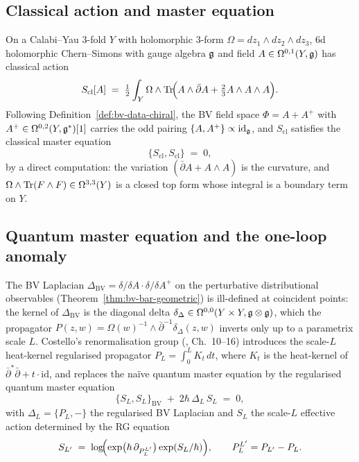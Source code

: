 \subsection{Classical action and master equation}
\label{subsec:hcs-cma}

On a Calabi--Yau $3$-fold $Y$ with holomorphic $3$-form
$\Omega = dz_1\wedge dz_2\wedge dz_3$, 6d holomorphic Chern--Simons
with gauge algebra $\mathfrak{g}$ and field
$A\in\Omega^{0,1}(Y,\mathfrak{g})$ has classical action
\begin{equation}\label{eq:hcs-classical-action}
 S_{\mathrm{cl}}[A] \;=\; \tfrac{1}{2}\int_Y \Omega\wedge
 \operatorname{Tr}\!\Bigl(A\wedge\bar\partial A + \tfrac{2}{3}A\wedge A\wedge A\Bigr).
\end{equation}
Following Definition~\ref{def:bv-data-chiral}, the BV field space
$\Phi = A + A^+$ with $A^+\in\Omega^{0,2}(Y,\mathfrak{g}^*)[1]$ carries the odd
pairing $\{A, A^+\}\propto \mathrm{id}_{\mathfrak{g}}$, and
$S_{\mathrm{cl}}$ satisfies the classical master equation
\begin{equation}\label{eq:cme}
 \{S_{\mathrm{cl}}, S_{\mathrm{cl}}\} \;=\; 0,
\end{equation}
by a direct computation: the variation $(\bar\partial A + A\wedge A)$
is the curvature, and $\Omega\wedge\operatorname{Tr}(F\wedge F)\in\Omega^{3,3}(Y)$ is
a closed top form whose integral is a boundary term on $Y$.

\subsection{Quantum master equation and the one-loop anomaly}
\label{subsec:hcs-qme}

The BV Laplacian
$\Delta_{\mathrm{BV}} = \delta/\delta A\cdot\delta/\delta A^+$ on the
perturbative distributional observables (Theorem~\ref{thm:bv-bar-geometric})
is ill-defined at coincident points: the kernel of
$\Delta_{\mathrm{BV}}$ is the diagonal delta
$\delta_{\Delta}\in\Omega^{0,0}(Y\times Y,\mathfrak{g}\otimes\mathfrak{g})$, which the
propagator
$P(z,w) = \Omega(w)^{-1}\wedge\bar\partial^{-1}\delta_{\Delta}(z,w)$
inverts only up to a parametrix scale $L$.
Costello's renormalisation group
(\cite{costello-renormalization}, Ch.~10--16) introduces the
scale-$L$ heat-kernel regularised propagator
$P_{L} = \int_0^{L} K_t\,dt$, where $K_t$ is the heat-kernel
of $\bar\partial^*\bar\partial + t\cdot\mathrm{id}$, and replaces the
na\"ive quantum master equation by the regularised quantum master equation
\begin{equation}\label{eq:qme}
 \{S_{L}, S_{L}\}_{\mathrm{BV}}
 \;+\; 2\hbar\,\Delta_{L}\,S_{L}
 \;=\; 0,
\end{equation}
with $\Delta_{L} = \{P_{L},-\}$ the regularised BV Laplacian and
$S_{L}$ the scale-$L$ effective action determined by the RG equation
\begin{equation}\label{eq:rg}
 S_{L'}
 \;=\;
 \log\!\Bigl(\exp\bigl(\hbar\,\partial_{P_{L}^{L'}}\bigr) \exp(S_{L}/\hbar)\Bigr),
 \qquad P_{L}^{L'} = P_{L'}-P_{L}.
\end{equation}

